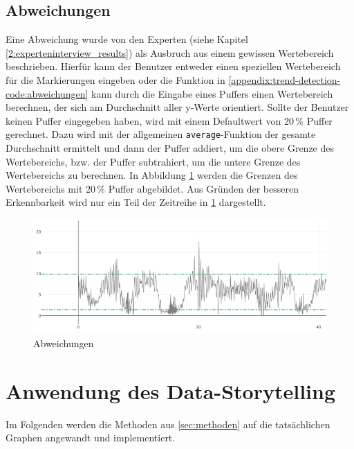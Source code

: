 \subsection{Abweichungen}
Eine Abweichung wurde von den Experten (siehe Kapitel \ref{2:experteninterview_results}) als Ausbruch aus einem gewissen Wertebereich beschrieben. Hierfür kann der Benutzer entweder einen speziellen Wertebereich für die Markierungen eingeben oder die Funktion in \ref{appendix:trend-detection-code:abweichungen} kann durch die Eingabe eines Puffers einen Wertebereich berechnen, der sich am Durchschnitt aller y-Werte orientiert. Sollte der Benutzer keinen Puffer eingegeben haben, wird mit einem Defaultwert von 20\,\% Puffer gerechnet. Dazu wird mit der allgemeinen \texttt{average}-Funktion der gesamte Durchschnitt ermittelt und dann der Puffer addiert, um die obere Grenze des Wertebereichs, bzw. der Puffer subtrahiert, um die untere Grenze des Wertebereichs zu berechnen. In Abbildung \ref{fig:deviations} werden die Grenzen des Wertebereichs mit 20\,\% Puffer abgebildet. Aus Gründen der besseren Erkennbarkeit wird nur ein Teil der Zeitreihe in \ref{fig:deviations} dargestellt.
\begin{figure}[h!]
\centering
\includegraphics[width=\textwidth]{gfx/deviations.png}
\caption{Abweichungen}
\label{fig:deviations}
\end{figure}

\section{Anwendung des Data-Storytelling}
Im Folgenden werden die Methoden aus \ref{sec:methoden} auf die tatsächlichen Graphen angewandt und implementiert.
